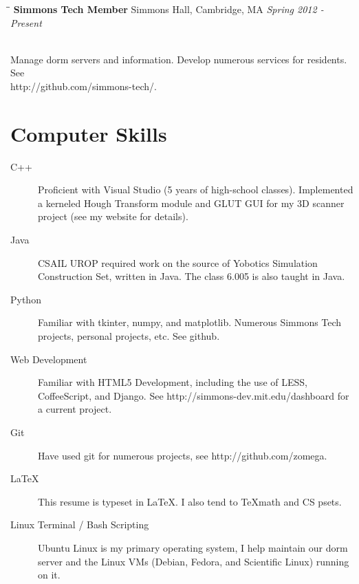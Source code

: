 \documentclass{res}
\begin{document}
\begin{resume}
			\begin{tabbing}
				\hspace{2.3in}\= \hspace{2.6in}\= \kill %
				{\bf Simmons Tech Member}	\>Simmons Hall, Cambridge, MA	\> \textit{Spring 2012 - Present}

				\\Manage dorm servers and information. Develop numerous services for residents. See\\http://github.com/simmons-tech/.

			\end{tabbing}

		\vspace{-20pt}
		\section{Computer Skills}

			\begin{description}

				\item[C++] Proficient with Visual Studio (5 years of high-school classes). Implemented a kerneled Hough Transform module  and GLUT GUI for my 3D scanner project (see my website for details).

				\item[Java] CSAIL UROP required work on the source of Yobotics Simulation Construction Set, written in Java. The class 6.005 is also taught in Java.

				\item[Python] Familiar with tkinter, numpy, and matplotlib. Numerous Simmons Tech projects, personal projects, etc. See github.

				\item[Web Development] Familiar with HTML5 Development, including the use of LESS, CoffeeScript, and Django. See http://simmons-dev.mit.edu/dashboard for a current project.

				\item[Git] Have used git for numerous projects, see http://github.com/zomega.

				\item[\LaTeX] This resume is typeset in \LaTeX. I also tend to \TeX \space math and CS psets.

				\item[Linux Terminal / Bash Scripting] Ubuntu Linux is my primary operating system, I help maintain our dorm server and the Linux VMs (Debian, Fedora, and Scientific Linux) running on it.

			\end{description}
	\end{resume}
\end{document}
